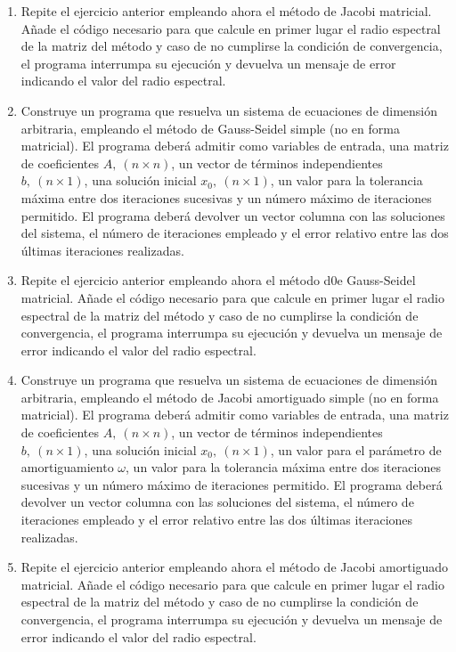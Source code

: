 \begin{enumerate}
\item Repite el ejercicio anterior empleando ahora el método de Jacobi matricial. Añade el código necesario para que calcule en primer lugar el radio espectral de la matriz del método y caso de no cumplirse  la condición de convergencia, el programa interrumpa su ejecución y devuelva un mensaje de error indicando el valor del radio espectral.

\item Construye un programa que resuelva un sistema de ecuaciones de dimensión arbitraria, empleando el método de Gauss-Seidel simple (no en forma matricial). El programa deberá admitir como variables de entrada, una matriz de coeficientes $ A,\ (n\times n)$, un vector de términos independientes $b,\ (n\times 1)$, una solución inicial $x_0 ,\ (n\times 1)$, un valor para la tolerancia máxima entre dos iteraciones sucesivas y un número máximo de iteraciones permitido. El programa deberá devolver un vector columna con las soluciones del sistema, el número de iteraciones empleado y el error relativo entre las dos últimas iteraciones realizadas.

\item Repite el ejercicio anterior empleando ahora el método d0e Gauss-Seidel matricial. Añade el código necesario para que calcule en primer lugar el radio espectral de la matriz del método y caso de no cumplirse  la condición de convergencia, el programa interrumpa su ejecución y devuelva un mensaje de error indicando el valor del radio espectral.

\item Construye un programa que resuelva un sistema de ecuaciones de dimensión arbitraria, empleando el método de Jacobi amortiguado simple (no en forma matricial). El programa deberá admitir como variables de entrada, una matriz de coeficientes $ A,\ (n\times n)$, un vector de términos independientes $b,\ (n\times 1)$, una solución inicial $x_0 ,\ (n\times 1)$, un valor para el parámetro de amortiguamiento $\omega$, un valor para la tolerancia máxima entre dos iteraciones sucesivas y un número máximo de iteraciones permitido. El programa deberá devolver un vector columna con las soluciones del sistema, el número de iteraciones empleado y el error relativo entre las dos últimas iteraciones realizadas.

\item Repite el ejercicio anterior empleando ahora el método de Jacobi amortiguado matricial. Añade el código necesario para que calcule en primer lugar el radio espectral de la matriz del método y caso de no cumplirse  la condición de convergencia, el programa interrumpa su ejecución y devuelva un mensaje de error indicando el valor del radio espectral.


\end{enumerate}
